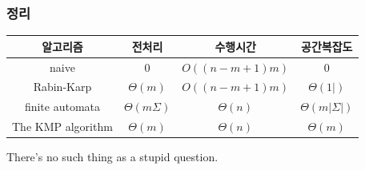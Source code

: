 \documentclass[10pt]{beamer}
\begin{document}
\begin{frame}
    \frametitle{정리}
    \begin{center}
        \begin{tabular}{| c | c | c | c |}
          \hline \hline
          알고리즘 & 전처리 & 수행시간     & 공간복잡도               \\   \hline
          naive & 0 &   $O((n-m+1)m)$   & 0         \\ \hline
          Rabin-Karp &$\Theta(m)$     & $O((n-m+1)m)$   &    $\Theta(1|)$      \\   \hline
           finite automata & $\Theta(m \Sigma)$  &  $\Theta(n)$ & $\Theta(m|\Sigma|)$ \\ \hline
          The KMP algorithm & $\Theta(m)$ &  $\Theta(n)$   &  $\Theta(m)$   \\   
          \hline\hline
        \end{tabular}
    \end{center}

\end{frame}


\begin{frame}
    \begin{center}
     \textrm{   There's no such thing as a stupid question.    }
    \end{center}
\end{frame}
\end{document}
